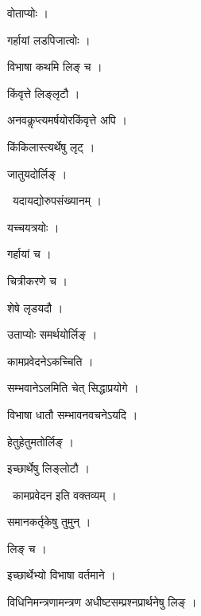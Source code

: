 \documentclass[10pt, openany, oneside]{book}
\begin{document}
\noindent वोताप्योः ।

\noindent गर्हायां लडपिजात्वोः ।

\noindent विभाषा कथमि लिङ् च ।

\noindent किंवृत्ते लिङ्लृटौ ।

\noindent अनवकॢप्त्यमर्षयोरकिंवृत्ते अपि ।

\noindent किंकिलास्त्यर्थेषु लृट् ।

\noindent जातुयदोर्लिङ् ।

\par\noindent\hspace{1.5em}{\vps वा॰}~{\qt यदायद्योरुपसंख्यानम् ।}

\noindent यच्चयत्रयोः ।

\noindent गर्हायां च ।

\noindent चित्रीकरणे च ।

\noindent शेषे लृडयदौ ।

\noindent उताप्योः समर्थयोर्लिङ् ।

\noindent कामप्रवेदनेऽकच्चिति ।

\noindent सम्भवानेऽलमिति चेत् सिद्धाप्रयोगे ।

\noindent विभाषा धातौ सम्भावनवचनेऽयदि ।

\noindent हेतुहेतुमतोर्लिङ् ।

\noindent इच्छार्थेषु लिङ्लोटौ ।

\par\noindent\hspace{1.5em}{\vps वा॰}~{\qt कामप्रवेदन इति वक्तव्यम् ।}

\noindent समानकर्तृकेषु तुमुन् ।

\noindent लिङ् च ।

\noindent इच्छार्थेभ्यो विभाषा वर्तमाने ।

\noindent विधिनिमन्त्रणामन्त्रण अधीष्टसम्प्रश्नप्रार्थनेषु लिङ् ।
\end{document}
